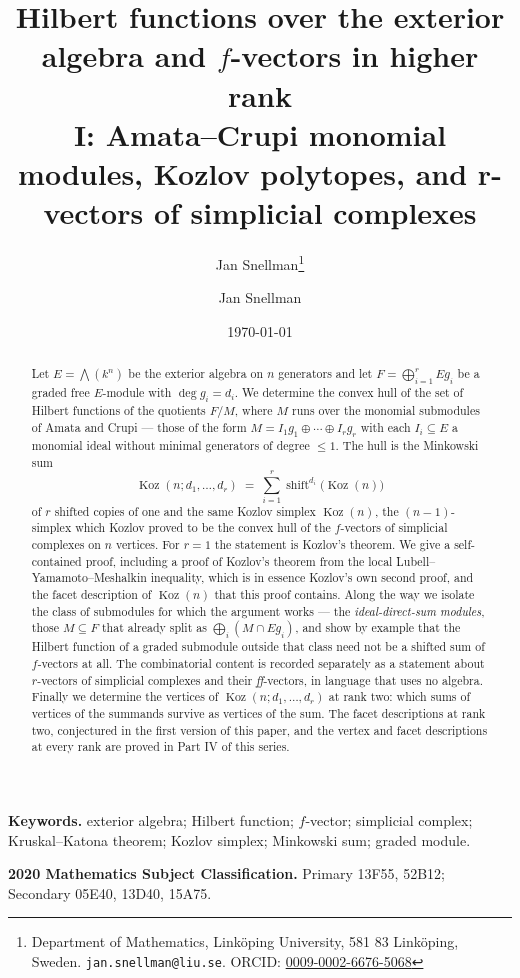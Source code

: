 \documentclass[11pt, a4paper, abstract=yes]{scrartcl}
\author{Jan Snellman\thanks{Department of Mathematics, Linköping University, 581 83 Linköping, Sweden. \texttt{jan.snellman@liu.se}. ORCID: \href{https://orcid.org/0009-0002-6676-5068}{0009-0002-6676-5068}}}
\author{Jan Snellman \orcidlink{0009-0002-6676-5068}}
\date{\today}
\title{Hilbert functions over the exterior algebra and \(f\)-vectors in higher rank\\\medskip
\large I: Amata--Crupi monomial modules, Kozlov polytopes, and r-vectors of simplicial complexes}
\theoremstyle{definition}
\theoremstyle{remark}
\theoremstyle{plain}
\newcommand{\Koz}{\operatorname{Koz}}
\newcommand{\shift}{\operatorname{shift}}
\let\autocite\cite
\begin{document}
\maketitle
\begin{abstract}
Let \(E=\bigwedge(k^n)\) be the exterior algebra on \(n\) generators and let
\(F=\bigoplus_{i=1}^{r}Eg_i\) be a graded free \(E\)-module with \(\deg g_i=d_i\). We determine the
convex hull of the set of Hilbert functions of the quotients \(F/M\), where \(M\) runs over the
monomial submodules of Amata and Crupi --- those of the form \(M=I_1g_1\oplus\cdots\oplus I_rg_r\)
with each \(I_i\subseteq E\) a monomial ideal without minimal generators of degree \(\le1\). The
hull is the Minkowski sum
\begin{equation}\label{eq:eq}
  \Koz(n;d_1,\dots,d_r)\;=\;\sum_{i=1}^{r}\shift^{d_i}\bigl(\Koz(n)\bigr)
\end{equation}
of \(r\) shifted copies of one and the same Kozlov simplex \(\Koz(n)\), the \((n-1)\)-simplex which
Kozlov proved \autocite{Kozlov1997} to be the convex hull of the \(f\)-vectors of simplicial complexes on \(n\)
vertices. For \(r=1\) the statement is Kozlov's theorem. We give a self-contained proof, including a
proof of Kozlov's theorem from the local Lubell--Yamamoto--Meshalkin inequality, which is in
essence Kozlov's own second proof, and the facet description of \(\Koz(n)\) that this proof
contains. Along the way we
isolate the class of submodules for which the argument works --- the \emph{ideal-direct-sum modules},
those \(M\subseteq F\) that already split as \(\bigoplus_i(M\cap Eg_i)\), and show by example that
the Hilbert function of a graded submodule outside that class need not be a shifted sum of
\(f\)-vectors at all. The combinatorial content is recorded separately as a statement about
\(r\)-vectors of simplicial complexes and their \emph{ff}-vectors, in language that uses no algebra.
Finally we determine the vertices of \(\Koz(n;d_1,\dots,d_r)\) at rank two: which
sums of vertices of the summands survive as vertices of the sum. The facet descriptions at rank two,
conjectured in the first version of this paper, and the vertex and facet descriptions at every rank
are proved in Part IV of this series.
\end{abstract}

\medskip\noindent\textbf{Keywords.} exterior algebra; Hilbert function; \(f\)-vector; simplicial
complex; Kruskal--Katona theorem; Kozlov simplex; Minkowski sum; graded module.

\smallskip\noindent\textbf{2020 Mathematics Subject Classification.} Primary 13F55, 52B12;
Secondary 05E40, 13D40, 15A75.
\medskip
\end{document}
